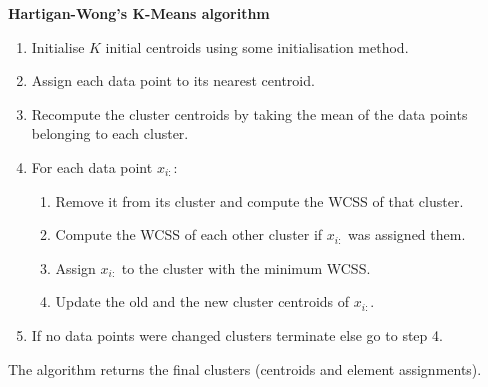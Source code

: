\documentclass[12pt]{article}
\begin{document}
\begin{center}
	\begin{tcolorbox}[breakable,colback=white!100!white,colframe=black!100!black]
		\noindent\textbf{Hartigan-Wong's K-Means algorithm}
		\begin{enumerate}
			\item Initialise $K$ initial centroids using some initialisation method. 
			
			\item Assign each data point to its nearest centroid. 
			
			\item Recompute the cluster centroids by taking the mean of the data points belonging to each cluster.
			
			\item For each data point $x_{i:}$:
			
			\begin{enumerate}
				\item Remove it from its cluster and compute the WCSS of that cluster.
				\item Compute the WCSS of each other cluster if $x_{i:}$ was assigned them.
				\item Assign $x_{i:}$ to the cluster with the minimum WCSS.
				\item Update the old and the new cluster centroids of $x_{i:}$.
			\end{enumerate}
			
			\item If no data points were changed clusters terminate else go to step 4.
			
		\end{enumerate}	
		The algorithm returns the final clusters (centroids and element assignments).
	\end{tcolorbox}
\end{center}

\cleardoublepage
\end{document}
